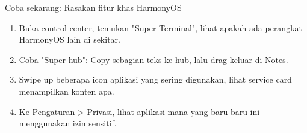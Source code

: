 \begin{tcbpractice}{Coba sekarang: Rasakan fitur khas HarmonyOS}
\begin{enumerate}
  \item Buka control center, temukan "Super Terminal", lihat apakah ada perangkat HarmonyOS lain di sekitar.
  \item Coba "Super hub": Copy sebagian teks ke hub, lalu drag keluar di Notes.
  \item Swipe up beberapa icon aplikasi yang sering digunakan, lihat service card menampilkan konten apa.
  \item Ke Pengaturan > Privasi, lihat aplikasi mana yang baru-baru ini menggunakan izin sensitif.
\end{enumerate}

\end{tcbpractice}

